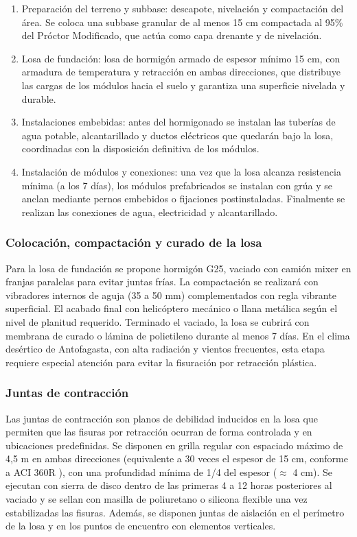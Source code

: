 \begin{enumerate}
    \item Preparación del terreno y subbase: descapote, nivelación y compactación del área. Se coloca una subbase granular de al menos 15 cm compactada al 95\% del Próctor Modificado, que actúa como capa drenante y de nivelación.

    \item Losa de fundación: losa de hormigón armado de espesor mínimo 15 cm, con armadura de temperatura y retracción en ambas direcciones, que distribuye las cargas de los módulos hacia el suelo y garantiza una superficie nivelada y durable.

    \item Instalaciones embebidas: antes del hormigonado se instalan las tuberías de agua potable, alcantarillado y ductos eléctricos que quedarán bajo la losa, coordinadas con la disposición definitiva de los módulos.

    \item Instalación de módulos y conexiones: una vez que la losa alcanza resistencia mínima (a los 7 días), los módulos prefabricados se instalan con grúa y se anclan mediante pernos embebidos o fijaciones postinstaladas. Finalmente se realizan las conexiones de agua, electricidad y alcantarillado.
\end{enumerate}

\subsubsection{Colocación, compactación y curado de la losa}

Para la losa de fundación se propone hormigón G25, vaciado con camión mixer en franjas paralelas para evitar juntas frías. La compactación se realizará con vibradores internos de aguja (35 a 50 mm) complementados con regla vibrante superficial. El acabado final con helicóptero mecánico o llana metálica según el nivel de planitud requerido. Terminado el vaciado, la losa se cubrirá con membrana de curado o lámina de polietileno durante al menos 7 días. En el clima desértico de Antofagasta, con alta radiación y vientos frecuentes, esta etapa requiere especial atención para evitar la fisuración por retracción plástica.

\subsubsection{Juntas de contracción}

Las juntas de contracción son planos de debilidad inducidos en la losa que permiten que las fisuras por retracción ocurran de forma controlada y en ubicaciones predefinidas. Se disponen en grilla regular con espaciado máximo de 4{,}5 m en ambas direcciones (equivalente a 30 veces el espesor de 15 cm, conforme a ACI 360R \cite{ACI360}), con una profundidad mínima de 1/4 del espesor ($\approx$ 4 cm). Se ejecutan con sierra de disco dentro de las primeras 4 a 12 horas posteriores al vaciado y se sellan con masilla de poliuretano o silicona flexible una vez estabilizadas las fisuras. Además, se disponen juntas de aislación en el perímetro de la losa y en los puntos de encuentro con elementos verticales.

